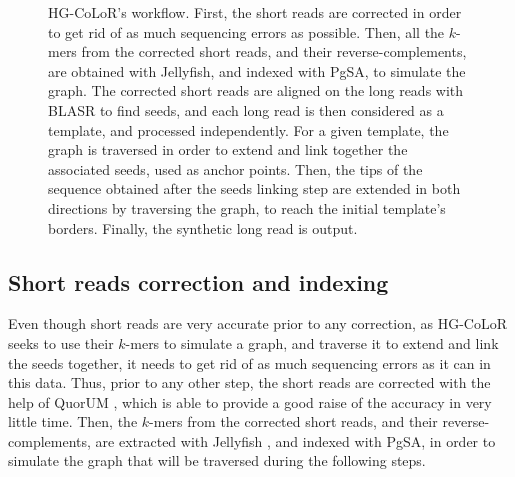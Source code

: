 \documentclass[long, final]{jobim2017}
\begin{document}
\begin{figure}
	\begin{center}
	\end{center}
	\caption{HG-CoLoR's workflow. First, the short reads are corrected in order to get rid of as much sequencing errors as possible. Then,
	all the $k$-mers from the corrected short reads, and their reverse-complements, are obtained with Jellyfish, and indexed with PgSA, to
	simulate the graph.
	The corrected short reads are aligned on the long reads with BLASR to find seeds, and each long read is then considered as a template, and
	processed
	independently. For a given template, the graph is traversed in order to extend and link together the associated seeds, used as
	anchor points. Then, the tips of the sequence obtained after the seeds linking step are extended in both directions by
	traversing the graph, to reach the
	initial template's borders. Finally, the synthetic long read is output. \label{OMWorkflow}}
\end{figure}

\subsection{Short reads correction and indexing}

Even though short reads are very accurate prior to any correction, as HG-CoLoR seeks to use their $k$-mers to simulate a graph, and traverse it to extend and link the seeds together, it needs to get rid of as much sequencing errors as it can in this data. Thus, prior to any other step, the short reads are corrected with the help of QuorUM \cite{Marcais2015}, which is able to provide a good raise of the accuracy in very little time. Then, the $k$-mers from the corrected short reads, and their reverse-complements, are extracted with Jellyfish \cite{Marcais2011}, and indexed with PgSA, in order to simulate the graph that will be traversed during the following steps.
\end{document}
